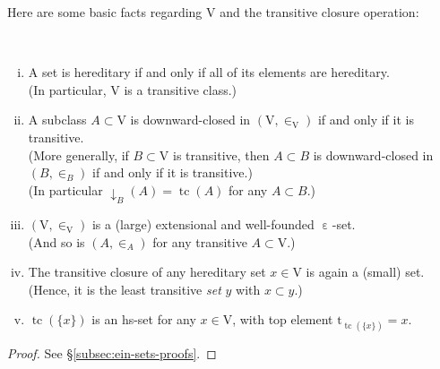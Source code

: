 \documentclass{amsart}
\newcommand\dwnfn{{\downarrow}}
\newcommand\ein{\mathrel{\varepsilon}}
\newcommand\enumbelow{\ }
\newcommand\rt{\mathrm{t}}
\newcommand\rV{\mathrm{V}}
\newcommand\set[2][]{#1\{ #2 #1\}}
\newcommand\tc{\operatorname{tc}}
\newcommand\unein{{\ein}}
\newcommand\unin{{\in}}
\theoremstyle{definition}
\theoremstyle{remark}
\theoremstyle{plainwithref}
\newenvironment{settybox}{\begin{tcolorbox}[colback=blue!20,breakable%
    ,enhanced%
    ,sharp corners%
    ,frame hidden%
    ,boxsep=0pt
    ,left=5pt,right=5pt,top=5pt,bottom=5pt
    ,enlarge left by=-5pt,width=\linewidth+10pt
    ,enlarge top by=5pt,enlarge bottom by=5pt
    ,before skip balanced=0pt,after skip balanced=0pt
    ]}{\end{tcolorbox}}
\begin{document}
Here are some basic facts regarding \( \rV \) and the transitive closure operation:
\begin{settybox}
  \begin{lem} \label{lem:v-and-tc-facts}
    \enumbelow
    \begin{enumerate}[(i)]
    \item\label{item:v-and-tc-facts-h-if-h} A set is hereditary if and only if all of its elements are hereditary. \\
      (In particular, \( \rV \) is a transitive class.)
    \item\label{item:v-and-tc-facts-dwn-is-tc} A subclass \( A \subset \rV \) is downward-closed in \( (\rV, \unin_\rV) \) if and only if it is transitive. \\
      (More generally, if \( B \subset \rV \) is transitive, then \( A \subset B \) is downward-closed in \( (B, \unin_B) \) if and only if it is transitive.) \\
      (In particular \( \dwnfn_B(A) = \tc(A) \) for any \( A \subset B \).)
    \item\label{item:v-and-tc-facts-v-wf} \( (\rV, \unin_\rV) \) is a (large) extensional and well-founded \( \unein \)-set. \\
      (And so is \( (A, \unin_A) \) for any transitive \( A \subset \rV \).)
    \item\label{item:v-and-tc-facts-tc-is-set} The transitive closure of any hereditary set \( x \in \rV \) is again a (small) set. \\
      (Hence, it is the least transitive \emph{set} \( y \) with \( x \subset y \).)
    \item\label{item:v-and-tc-facts-tc-is-hs} \( \tc(\set{x}) \) is an hs-set for any \( x \in \rV \), with top element \( \rt_{\tc(\set{x})} = x \).
    \end{enumerate}
  \end{lem}

  \begin{proof}
    See \hyperref[proof:v-and-tc-facts]{\S\ref*{subsec:ein-sets-proofs}}.
  \end{proof}
\end{settybox}
\end{document}

